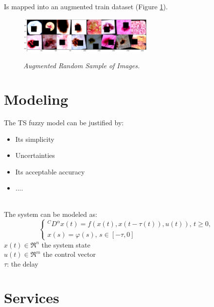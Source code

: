 \documentclass[dvipsnames,mathserif]{beamer}
\begin{document}
{\begin{frame}
      Is mapped into an augmented train dataset (Figure \ref{fig:aug-sample-of-datasets}).

      \begin{figure}[H]
        \centering
        \includegraphics[width=0.6\textwidth]{images/random-sample-of-isic-augmented.png}
        \caption[Augmented Random Sample of Images]{\footnotesize{\textit{Augmented Random Sample of Images.}}}
        {\label{fig:aug-sample-of-datasets}}
      \end{figure}

    \end{frame}



%
    \section{Modeling}
    \begin{frame}
      \footnotesize
      The TS fuzzy model can be justified by:
      \begin{itemize}
        \item Its simplicity
        \item Uncertainties
        \item Its acceptable accuracy
        \item ....
      \end{itemize}
      \pause
      \quad \\
      The system can be modeled as:
      \begin{equation*}
        \left\{\begin{array}{l}
            { }^C D^\alpha x(t)=f(x(t),x(t-\tau(t)),u(t)),\, t \geq 0, \\
            x(s)=\varphi(s),\, s \in[-\tau, 0]
        \end{array}\right.
      \end{equation*}
      $x(t) \in \Re ^{n}$ the system state\\
      $u(t) \in \Re ^{m}$ the control vector \\
      $\tau$: the delay
    \end{frame}



    \section{Services}

}
\end{document}
